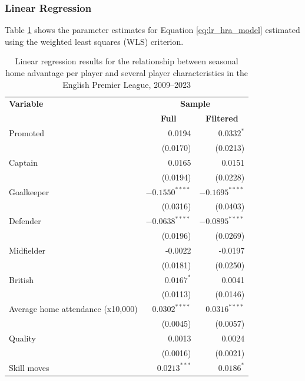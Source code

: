 \subsubsection{Linear Regression}
Table \ref{tab:lr_parameters} shows the parameter estimates for Equation \ref{eq:lr_hra_model} estimated using the weighted least squares (WLS) criterion. \\

\begin{table}[htbp]
    \begin{spacing}{1.5}
    \small
    \centering
    \caption{Linear regression results for the relationship between seasonal home advantage per player and several player characteristics in the English Premier League, 2009--2023}
    \label{tab:lr_parameters}
    \begin{tabular}{p{7cm}rr}
        \toprule
        \toprule
        \textbf{Variable} & \multicolumn{2}{c}{\textbf{Sample}} \\
        \cmidrule{2-3}          & \multicolumn{1}{c}{\textbf{Full}} & \multicolumn{1}{c}{\textbf{Filtered}} \\
        \midrule
        Promoted & 0.0194 & $0.0332^{*}$ \\
              & (0.0170) & (0.0213) \\
        Captain & 0.0165 & 0.0151 \\
              & (0.0194) & (0.0228) \\
        Goalkeeper & $-0.1550^{****}$ & $-0.1695^{****}$ \\
              & (0.0316) & (0.0403) \\
        Defender & $-0.0638^{****}$ & $-0.0895^{****}$ \\
              & (0.0196) & (0.0269) \\
        Midfielder & -0.0022 & -0.0197 \\
              & (0.0181) & (0.0250) \\
        British & $0.0167^{*}$ & 0.0041 \\
              & (0.0113) & (0.0146) \\
        Average home attendance (x10,000) & $0.0302^{****}$ & $0.0316^{****}$ \\
              & (0.0045) & (0.0057) \\
        Quality & 0.0013 & 0.0024 \\
              & (0.0016) & (0.0021) \\
        Skill moves & $0.0213^{***}$ & $0.0186^{*}$ \\

\end{tabular}
\end{spacing}
\end{table}
